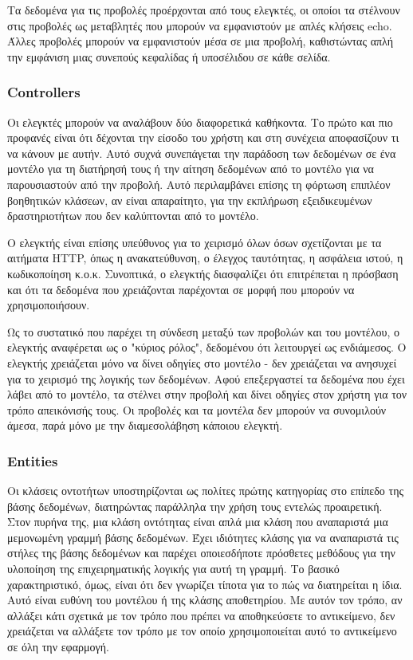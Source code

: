 Τα δεδομένα για τις προβολές προέρχονται από τους ελεγκτές, οι οποίοι τα στέλνουν στις προβολές ως μεταβλητές που μπορούν να εμφανιστούν με απλές κλήσεις echo. Άλλες προβολές μπορούν να εμφανιστούν μέσα σε μια προβολή, καθιστώντας απλή την εμφάνιση μιας συνεπούς κεφαλίδας ή υποσέλιδου σε κάθε σελίδα.

\subsubsection{Controllers} \label{thb:Controllers}
Οι ελεγκτές μπορούν να αναλάβουν δύο διαφορετικά καθήκοντα. Το πρώτο και πιο προφανές είναι ότι δέχονται την είσοδο του χρήστη και στη συνέχεια αποφασίζουν τι να κάνουν με αυτήν. Αυτό συχνά συνεπάγεται την παράδοση των δεδομένων σε ένα μοντέλο για τη διατήρησή τους ή την αίτηση δεδομένων από το μοντέλο για να παρουσιαστούν από την προβολή. Αυτό περιλαμβάνει επίσης τη φόρτωση επιπλέον βοηθητικών κλάσεων, αν είναι απαραίτητο, για την εκπλήρωση εξειδικευμένων δραστηριοτήτων που δεν καλύπτονται από το μοντέλο.

Ο ελεγκτής είναι επίσης υπεύθυνος για το χειρισμό όλων όσων σχετίζονται με τα αιτήματα HTTP, όπως η ανακατεύθυνση, ο έλεγχος ταυτότητας, η ασφάλεια ιστού, η κωδικοποίηση κ.ο.κ. Συνοπτικά, ο ελεγκτής διασφαλίζει ότι επιτρέπεται η πρόσβαση και ότι τα δεδομένα που χρειάζονται παρέχονται σε μορφή που μπορούν να χρησιμοποιήσουν.

Ως το συστατικό που παρέχει τη σύνδεση μεταξύ των προβολών και του μοντέλου, ο ελεγκτής αναφέρεται ως ο "κύριος ρόλος", δεδομένου ότι λειτουργεί ως ενδιάμεσος. Ο ελεγκτής χρειάζεται μόνο να δίνει οδηγίες στο μοντέλο - δεν χρειάζεται να ανησυχεί για το χειρισμό της λογικής των δεδομένων. Αφού επεξεργαστεί τα δεδομένα που έχει λάβει από το μοντέλο, τα στέλνει στην προβολή και δίνει οδηγίες στον χρήστη για τον τρόπο απεικόνισής τους. Οι προβολές και τα μοντέλα δεν μπορούν να συνομιλούν άμεσα, παρά μόνο με την διαμεσολάβηση κάποιου ελεγκτή.

\subsubsection{Entities} \label{thb:Entities}
Οι κλάσεις οντοτήτων υποστηρίζονται ως πολίτες πρώτης κατηγορίας στο επίπεδο της βάσης δεδομένων, διατηρώντας παράλληλα την χρήση τους εντελώς προαιρετική.
Στον πυρήνα της, μια κλάση οντότητας είναι απλά μια κλάση που αναπαριστά μια μεμονωμένη γραμμή βάσης δεδομένων. Έχει ιδιότητες κλάσης για να αναπαριστά τις στήλες της βάσης δεδομένων και παρέχει οποιεσδήποτε πρόσθετες μεθόδους για την υλοποίηση της επιχειρηματικής λογικής για αυτή τη γραμμή. Το βασικό χαρακτηριστικό, όμως, είναι ότι δεν γνωρίζει τίποτα για το πώς να διατηρείται η ίδια. Αυτό είναι ευθύνη του μοντέλου ή της κλάσης αποθετηρίου. Με αυτόν τον τρόπο, αν αλλάξει κάτι σχετικά με τον τρόπο που πρέπει να αποθηκεύσετε το αντικείμενο, δεν χρειάζεται να αλλάξετε τον τρόπο με τον οποίο χρησιμοποιείται αυτό το αντικείμενο σε όλη την εφαρμογή.

